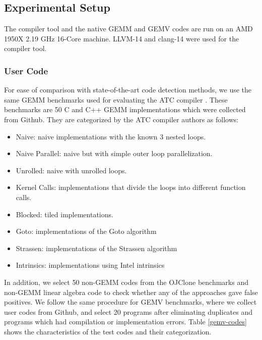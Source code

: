 \documentclass[manuscript,screen,review]{acmart}
\begin{document}
\subsection{Experimental Setup}
The compiler tool and the native GEMM and GEMV codes are run on an AMD 1950X 2.19 GHz 16-Core machine. LLVM-14 and clang-14 were used for the compiler tool.  

\subsubsection{User Code}
For ease of comparison with state-of-the-art code detection methods, we use the same GEMM benchmarks used for evaluating the ATC compiler \cite{ATC}. These benchmarks are 50 C and C++ GEMM implementations which were collected from Github. They are categorized by the ATC compiler authors as follows: 
\begin{itemize}
	\item Naive: naive implementations with the known 3 nested loops.
	\item Naive Parallel: naive but with simple outer loop parallelization.
	\item Unrolled: naive with unrolled loops.
	\item Kernel Calls: implementations that divide the loops into different function calls.
	\item Blocked: tiled implementations.
	\item Goto: implementations of the Goto algorithm \cite{Goto}
	\item Strassen: implementations of the Strassen algorithm \cite{STRASSEN1969}
	\item Intrinsics: implementations using Intel intrinsics
\end{itemize}
In addition, we select 50 non-GEMM codes from the OJClone benchmarks and non-GEMM linear algebra code to check whether any of the approaches gave false positives. We follow the same procedure for GEMV benchmarks, where we collect user codes from Github, and select 20 programs after eliminating duplicates and programs which had compilation or implementation errors. Table \ref{gemv-codes} shows the characteristics of the test codes and their categorization.

\end{document}
